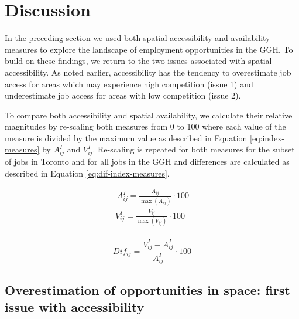 \documentclass[]{elsarticle} %
\begin{document}
\newpage

\hypertarget{discussion}{%
\section{Discussion}\label{discussion}}

In the preceding section we used both spatial accessibility and
availability measures to explore the landscape of employment
opportunities in the GGH. To build on these findings, we return to the
two issues associated with spatial accessibility. As noted earlier,
accessibility has the tendency to overestimate job access for areas
which may experience high competition (issue 1) and underestimate job
access for areas with low competition (issue 2).

To compare both accessibility and spatial availability, we calculate
their relative magnitudes by re-scaling both measures from 0 to 100
where each value of the measure is divided by the maximum value as
described in Equation \ref{eq:index-measures} by \(A^I_{ij}\) and
\(V^I_{ij}\). Re-scaling is repeated for both measures for the subset of
jobs in Toronto and for all jobs in the GGH and differences are
calculated as described in Equation \ref{eq:dif-index-measures}.

\begin{equation}
\label{eq:index-measures}
\begin{array}{l}\
A^I_{ij} = \frac{A_{ij}}{\max(A_{ij})}\cdot100\\
V^I_{ij} = \frac{V_{ij}}{\max(V_{ij})}\cdot100\\
\end{array}
\end{equation}

\begin{equation}
\label{eq:dif-index-measures}
Dif_{ij} = \frac{V^I_{ij} - A^I_{ij}}{A^I_{ij}}\cdot100
\end{equation}

\hypertarget{overestimation-of-opportunities-in-space-first-issue-with-accessibility}{%
\subsection{Overestimation of opportunities in space: first issue with
accessibility}\label{overestimation-of-opportunities-in-space-first-issue-with-accessibility}}
\end{document}
